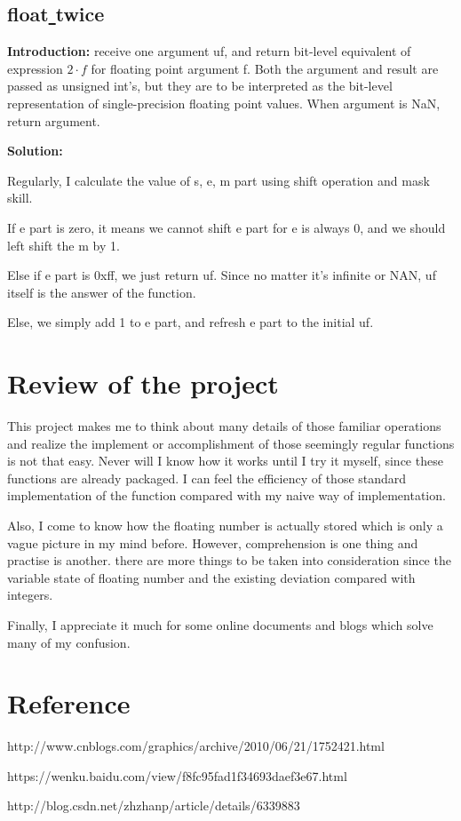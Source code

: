 \documentclass[12pt,a4paper]{article}
\theoremstyle{definition}
\numberwithin{equation}{section}
\numberwithin{figure}{section}
\begin{document}
\begin{spacing}{1.5}
\subsection{float\underline{ }twice}
\textbf{Introduction: }receive one argument uf, and return bit-level equivalent of expression $2\cdot f$ for floating point argument f. Both the argument and result are passed as unsigned int's, but they are to be interpreted as the bit-level representation of single-precision floating point values. When argument is NaN, return argument.\par
\textbf{Solution: }\par
Regularly, I calculate the value of s, e, m part using shift operation and mask skill.\par
If e part is zero, it means we cannot shift e part for e is always 0, and we should left shift the m by 1.\par
Else if e part is 0xff, we just return uf. Since no matter it's infinite or NAN, uf itself is the answer of the function.\par
Else, we simply add 1 to e part, and refresh e part to the initial uf.\par
\section{Review of the project}
This project makes me to think about many details of those familiar operations and realize the implement or accomplishment of those seemingly regular functions is not that easy. Never will I know how it works until I try it myself, since these functions are already packaged. I can feel the efficiency of those standard implementation of the function compared with my naive way of implementation.\par
Also, I come to know how the floating number is actually stored which is only a vague picture in my mind before. However, comprehension is one thing and practise is another. there are more things to be taken into consideration since the variable state of floating number and the existing deviation compared with integers.\par
Finally, I appreciate it much for some online documents and blogs which solve many of my confusion.\par
\section{Reference}
http://www.cnblogs.com/graphics/archive/2010/06/21/1752421.html\par
https://wenku.baidu.com/view/f8fc95fad1f34693daef3e67.html\par
http://blog.csdn.net/zhzhanp/article/details/6339883\par
\end{spacing}
\end{document}
